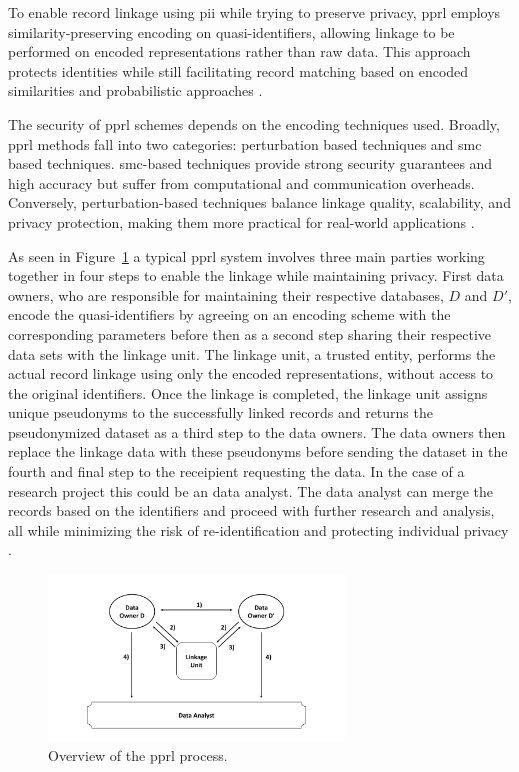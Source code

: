 To enable record linkage using \ac{pii} while trying to preserve privacy, \ac{pprl} employs similarity-preserving encoding on quasi-identifiers, allowing linkage to be performed on encoded representations rather than raw data.
This approach protects identities while still facilitating record matching based on encoded similarities and probabilistic approaches \cite{schaefer2024,vidanage2020graph}.

The security of \ac{pprl} schemes depends on the encoding techniques used.
Broadly, \ac{pprl} methods fall into two categories: perturbation based techniques and \ac{smc} based techniques.
\ac{smc}-based techniques provide strong security guarantees and high accuracy but suffer from computational and communication overheads.
Conversely, perturbation-based techniques balance linkage quality, scalability, and privacy protection, making them more practical for real-world applications \cite{vidanage2020graph}.

As seen in Figure~\ref{fig:pprloverview} a typical \ac{pprl} system involves three main parties working together in four steps to enable the linkage while maintaining privacy.
First data owners, who are responsible for maintaining their respective databases, \(D\) and \(D'\), encode the quasi-identifiers by agreeing on an encoding scheme with the corresponding parameters before then as a second step sharing their respective data sets with the linkage unit.
The linkage unit, a trusted entity, performs the actual record linkage using only the encoded representations, without access to the original identifiers.
Once the linkage is completed, the linkage unit assigns unique pseudonyms to the successfully linked records and returns the pseudonymized dataset as a third step to the data owners.
The data owners then replace the linkage data with these pseudonyms before sending the dataset in the fourth and final step to the receipient requesting the data.
In the case of a research project this could be an data analyst.
The data analyst can merge the records based on the identifiers and proceed with further research and analysis, all while minimizing the risk of re-identification and protecting individual privacy \cite{schaefer2024}.

\begin{figure}[H]
  \centering
  \includegraphics[width=0.7\textwidth, page=1]{img/visualization.pdf}
  \caption{Overview of the \ac{pprl} process.}
  \label{fig:pprloverview}
\end{figure}

